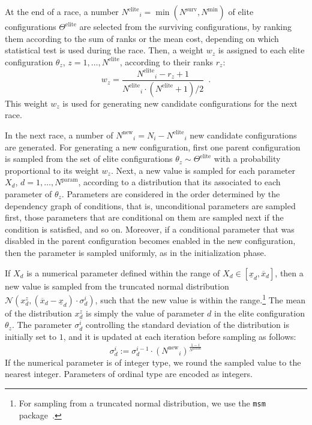 \documentclass[a4paper]{article}
\newcommand{\assign}{\ensuremath{:=}}
\newcommand{\iter}{\ensuremath{i}\xspace}
\newcommand{\Ncand}[1][]{\ensuremath{N_{#1}}\xspace}
\newcommand{\Nparam}{\ensuremath{{N^\text{param}}}\xspace}
\newcommand{\Nmin}{\ensuremath{N^\text{min}}\xspace}
\newcommand{\Nsurv}{\ensuremath{N^\text{surv}}\xspace}
\newcommand{\Nelite}{\ensuremath{N^\text{elite}}\xspace}
\newcommand{\Nnew}{\ensuremath{N^\text{new}}\xspace}
\newcommand{\Celite}{\ensuremath{\Theta^\text{elite}}\xspace}
\begin{document}
At the end of a race, a number $\Nelite_i = \min(\Nsurv, \Nmin)$ of
elite configurations $\Celite$ are selected from the
surviving configurations, by ranking them according to the sum of
ranks or the mean cost, depending on which statistical test is used
during the race. Then, a weight $w_z$ is assigned to each elite
configuration $\theta_z$, $z=1,\dotsc, \Nelite$, according to their
ranks $r_z$:
%
\begin{equation}\label{eq:weight}
  w_z = \frac{\Nelite_i - r_z + 1}{\Nelite_i \cdot (\Nelite + 1) /2}\enspace.
\end{equation}
%
This weight $w_z$ is used for generating new candidate configurations
for the next race. 

In the next race, a number of $\Nnew_i = \Ncand[\iter] - \Nelite_i$ new
candidate configurations are generated. For generating a new
configuration, first one parent configuration is
sampled from the set of elite configurations $\theta_z\sim\Celite$
with a probability proportional to its weight $w_z$. Next, a new value
is sampled for each parameter $X_d$, $d=1,\dotsc,\Nparam$, according
to a distribution that its associated to each parameter of
$\theta_z$. Parameters are considered in the order determined by the
dependency graph of conditions, that is, unconditional parameters are
sampled first, those parameters that are conditional on them are
sampled next if the condition is satisfied, and so on. Moreover, if a conditional parameter that was disabled in the
parent configuration becomes enabled in the new configuration, then
the parameter is sampled uniformly, as in the initialization phase.

If $X_d$ is a numerical parameter defined within the range of $X_d \in
[\underline{x}_d, \overline{x}_d]$, then a new value is sampled from
the truncated normal distribution $\mathcal{N}(x_d^z, (\overline{x}_d - \underline{x}_d)\cdot\sigma_d^i)$,
such that the new value is within the range.\footnote{%
  For sampling from a truncated normal distribution, we use the
  \texttt{msm} package~\citep{Jac2011jss}.} The mean of the
distribution $x_d^z$ is simply the value of parameter $d$ in the elite
configuration $\theta_z$. The parameter $\sigma_d^i$ controlling the standard deviation of the distribution is initially set to $1$, and it is updated at each iteration before sampling as follows:
%
\begin{equation}\label{eq:sigma}
  \sigma_d^i \assign  \sigma_d^{i-1} \cdot {(\Nnew_i)}^{\frac{1-i}{\Nparam}}
\end{equation}
%
If the numerical parameter is of integer type, we round the sampled
value to the nearest integer. Parameters of ordinal type are
encoded as integers.
\end{document}
